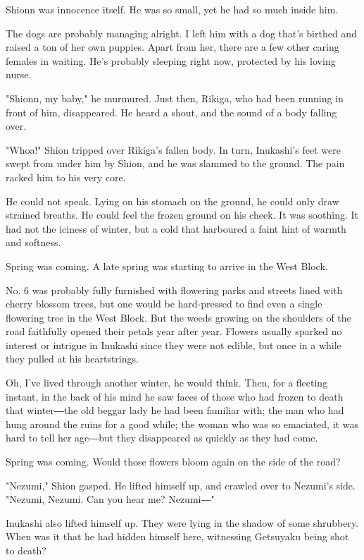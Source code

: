Shionn was innocence itself. He was so small, yet he had so much inside
him.

The dogs are probably managing alright. I left him with a dog that's
birthed and raised a ton of her own puppies. Apart from her, there are a
few other caring females in waiting. He's probably sleeping right now,
protected by his loving nurse.

"Shionn, my baby," he murmured. Just then, Rikiga, who had been running
in front of him, disappeared. He heard a shout, and the sound of a body
falling over.

"Whoa!" Shion tripped over Rikiga's fallen body. In turn, Inukashi's
feet were swept from under him by Shion, and he was slammed to the
ground. The pain racked him to his very core.

He could not speak. Lying on his stomach on the ground, he could only
draw strained breaths. He could feel the frozen ground on his cheek. It
was soothing. It had not the iciness of winter, but a cold that
harboured a faint hint of warmth and softness.

Spring was coming. A late spring was starting to arrive in the West
Block.

No. 6 was probably fully furnished with flowering parks and streets
lined with cherry blossom trees, but one would be hard-pressed to find
even a single flowering tree in the West Block. But the weeds growing on
the shoulders of the road faithfully opened their petals year after
year. Flowers usually sparked no interest or intrigue in Inukashi since
they were not edible, but once in a while they pulled at his
heartstrings.

Oh, I've lived through another winter, he would think. Then, for a
fleeting instant, in the back of his mind he saw faces of those who had
frozen to death that winter―the old beggar lady he had been familiar
with; the man who had hung around the ruins for a good while; the woman
who was so emaciated, it was hard to tell her age―but they disappeared
as quickly as they had come.

Spring was coming. Would those flowers bloom again on the side of the
road?

"Nezumi," Shion gasped. He lifted himself up, and crawled over to
Nezumi's side. "Nezumi, Nezumi. Can you hear me? Nezumi―"

Inukashi also lifted himself up. They were lying in the shadow of some
shrubbery. When was it that he had hidden himself here, witnessing
Getsuyaku being shot to death?

